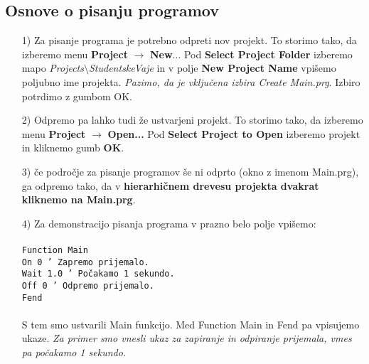 \subsection{Osnove o pisanju programov}
\vspace{0.5cm}
\begin{enumerate}

    \item[1)] Za pisanje programa je potrebno odpreti nov projekt. To storimo tako, %
    da izberemo menu \textbf{Project} $\longrightarrow$ \textbf{New}... Pod \textbf{Select Project Folder} izberemo mapo %
    \emph{Projects$\setminus$StudentskeVaje} in v polje \textbf{New Project Name} vpišemo poljubno ime %
    projekta. \emph{Pazimo, da je vključena izbira Create Main.prg}. Izbiro potrdimo z gumbom OK.%

    \item[2)]  Odpremo pa lahko tudi že ustvarjeni projekt. To storimo tako, da izberemo menu %
    \textbf{Project} $\longrightarrow$ \textbf{Open...} Pod \textbf{Select Project to Open} %
    izberemo projekt in kliknemo gumb \textbf{OK}.%

    \item[3)]  če področje za pisanje programov še ni odprto (okno z imenom Main.prg), %
    ga odpremo tako, da v \textbf{hierarhičnem drevesu projekta dvakrat kliknemo na Main.prg}. %

    \item[4)]  Za demonstracijo pisanja programa v prazno belo polje vpišemo: \\%
        \\
\small
        \hspace*{0.0cm}   \texttt{Function Main} \\%
        \hspace*{0.3cm}   \texttt{On 0 \hspace{1.35cm} ' Zapremo prijemalo.} \\%
        \hspace*{0.3cm}   \texttt{Wait 1.0 \hspace{0.6cm} ' Počakamo 1 sekundo.} \\%
        \hspace*{0.3cm}   \texttt{Off 0 \hspace{1.15cm} ' Odpremo prijemalo.} \\%
        \hspace*{0.0cm}   \texttt{Fend} \\%
        \\
\normalsize
    S tem smo ustvarili Main funkcijo. Med Function Main in Fend pa
    vpisujemo ukaze. \emph{Za primer smo vnesli ukaz za zapiranje in
    odpiranje prijemala, vmes pa počakamo 1 sekundo.}


\end{enumerate}
